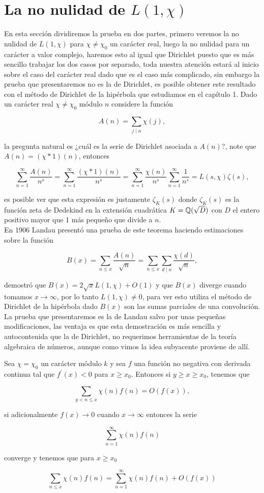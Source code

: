 \section{La no nulidad de \texorpdfstring{$L(1,\chi)$}{Lg}}

En esta sección dividiremos la prueba en dos partes, primero veremos la no nulidad de $L(1,\chi)$ para $\chi\neq\chi_0$ un carácter real, luego la no nulidad para un carácter a valor complejo, haremos esto al igual que Dirichlet puesto que es más sencillo trabajar los dos casos por separado, toda nuestra atención estará al inicio sobre el caso del carácter real dado que es el caso más complicado, sin embargo la prueba que presentaremos no es la de Dirichlet, es posible obtener este resultado con el método de Dirichlet de la hipérbola que estudiamos en el capítulo 1. Dado un carácter real $\chi\neq\chi_0$ módulo $n$ considere la función

$$A(n)=\sum_{j\mid n}\chi(j),$$

la  pregunta natural es ¿cuál es la serie de Dirichlet asociada a $A(n)$?, note que $A(n)=(\chi*1)(n)$, entonces

$$\sum_{n=1}^{\infty} \frac{A(n)}{n^s}=\sum_{n=1}^{\infty} \frac{(\chi*1)(n)}{n^s}=\sum_{n=1}^{\infty} \frac{\chi(n)}{n^s}\sum_{n=1}^{\infty} \frac{1}{n^s}=L(s,\chi)\zeta(s),$$

es posible ver que esta expresión es justamente $\zeta_K(s)$ donde $\zeta_K(s)$ es la función zeta de Dedekind en la extensión cuadrática $K=\mathbb{Q}(\sqrt{D})$ con $D$ el entero positivo mayor que 1 más pequeño que divide a $n$.\\

En 1906 Landau presentó una prueba de este teorema haciendo estimaciones sobre la función 

$$B(x)=\sum_{n\leq x}\frac{A(n)}{\sqrt{n}}=\sum_{n\leq x}\sum_{d\mid n}\frac{\chi(d)}{\sqrt{n} },$$

demostró que $B(x)=2 \sqrt{x}L(1,\chi)+O(1)$ y que $B(x)$ diverge cuando tomamos $x\to\infty$, por lo tanto $L(1,\chi)\neq 0$, para ver esto utiliza el método de Dirichlet de la hipérbola dado $B(x)$ son las sumas parciales de una convolución. La prueba que presentaremos es la de Landau salvo por unas pequeñas modificaciones, las ventaja es que esta demostración es más sencilla y autocontenida que la de Dirichlet, no requerimos herramientas de la teoría algebraica de números, aunque como vimos la idea subyacente proviene de allí.

\begin{theorem}
Sea $\chi=\chi_0$ un carácter módulo $k$ y sea $f$ una función no negativa con derivada continua tal que $f^{\prime}(x)<0$ para $x\geq x_0$. Entonces si $y\geq x\geq x_0$, tenemos que

$$\sum_{y<n\leq x}\chi(n)f(n)=O(f(x)),$$

si adicionalmente $f(x)\to 0$ cuando $x\to \infty$ entonces la serie

$$\sum_{n=1}^{\infty} \chi(n)f(n)$$

converge y tenemos que para $x\geq x_0$

$$\sum_{n\leq x}\chi(n)f(n)=\sum_{n=1}^{\infty} \chi(n)f(n)+O(f(x))$$
\end{theorem}

